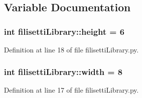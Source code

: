 \subsection{\-Variable \-Documentation}
\hypertarget{namespacefilisetti_library_a0dd9d0f4fa4bf1c5453ff6955bbdeb28}{
\subsubsection[{height}]{\setlength{\rightskip}{0pt plus 5cm}int {\bf filisetti\-Library\-::height} = 6}}\label{namespacefilisetti_library_a0dd9d0f4fa4bf1c5453ff6955bbdeb28}


\-Definition at line 18 of file filisetti\-Library.\-py.

\hypertarget{namespacefilisetti_library_a5a12655d430f8c004af413e255dff4bc}{
\subsubsection[{width}]{\setlength{\rightskip}{0pt plus 5cm}int {\bf filisetti\-Library\-::width} = 8}}\label{namespacefilisetti_library_a5a12655d430f8c004af413e255dff4bc}


\-Definition at line 17 of file filisetti\-Library.\-py.

